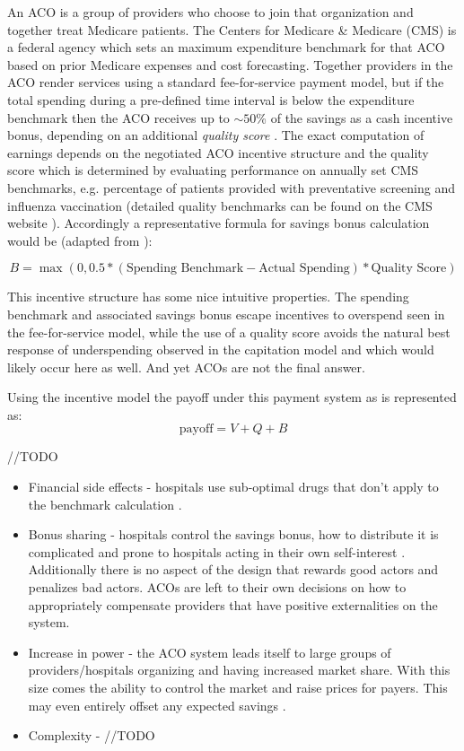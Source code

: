 \documentclass{article}
\begin{document}
An ACO is a group of providers who choose to join that organization and together treat Medicare patients. The Centers for Medicare \& Medicare (CMS) is a federal agency which sets an maximum expenditure benchmark for that ACO based on prior Medicare expenses and cost forecasting. Together providers in the ACO render services using a standard fee-for-service payment model, but if the total spending during a pre-defined time interval is below the expenditure benchmark then the ACO receives up to ${\sim}50$\% of the savings as a cash incentive bonus, depending on an additional \emph{quality score} \cite{acos}. The exact computation of earnings depends on the negotiated ACO incentive structure and the quality score which is determined by evaluating performance on annually set CMS benchmarks, e.g. percentage of patients provided with preventative screening and influenza vaccination (detailed quality benchmarks can be found on the CMS website \cite{cms}). Accordingly a representative formula for savings bonus calculation would be (adapted from \cite{acos}):

\begin{equation}
    B = \max (0, 0.5 * (\text{Spending Benchmark} - \text{Actual Spending}) * \text{Quality Score})
\end{equation}

This incentive structure has some nice intuitive properties. The spending benchmark and associated savings bonus escape incentives to overspend seen in the fee-for-service model, while the use of a quality score avoids the natural best response of underspending observed in the capitation model and which would likely occur here as well. And yet ACOs are not the final answer.

Using the incentive model the payoff under this payment system as is represented as:
\begin{equation}
    \text{payoff} = V + Q + B
\end{equation}

//TODO
\begin{itemize}
    \item Financial side effects - hospitals use sub-optimal drugs that don't apply to the benchmark calculation \cite{acoethics}.
    \item Bonus sharing - hospitals control the savings bonus, how to distribute it is complicated and prone to hospitals acting in their own self-interest \cite{inflation}. Additionally there is no aspect of the design that rewards good actors and penalizes bad actors. ACOs are left to their own decisions on how to appropriately compensate providers that have positive externalities on the system.
    \item Increase in power - the ACO system leads itself to large groups of providers/hospitals organizing and having increased market share. With this size comes the ability to control the market and raise prices for payers. This may even entirely offset any expected savings \cite{acoecon}.
    \item Complexity - //TODO
\end{itemize}
\end{document}
